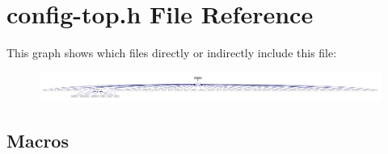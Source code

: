 \hypertarget{config-top_8h}{}\section{config-\/top.h File Reference}
\label{config-top_8h}
This graph shows which files directly or indirectly include this file\+:
\nopagebreak
\begin{figure}[H]
\begin{center}
\leavevmode
\includegraphics[width=350pt]{config-top_8h__dep__incl}
\end{center}
\end{figure}
\subsection*{Macros}

